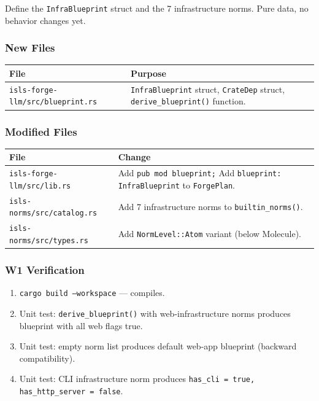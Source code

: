 \documentclass[11pt,a4paper]{article}
\begin{document}
Define the \texttt{InfraBlueprint} struct and the 7 infrastructure 
norms. Pure data, no behavior changes yet.

\subsubsection{New Files}

\begin{longtable}{lp{10cm}}
\toprule
\textbf{File} & \textbf{Purpose} \\
\midrule
\texttt{isls-forge-llm/src/blueprint.rs}
  & \texttt{InfraBlueprint} struct, \texttt{CrateDep} struct,
    \texttt{derive\_blueprint()} function. \\
\bottomrule
\end{longtable}

\subsubsection{Modified Files}

\begin{longtable}{lp{10cm}}
\toprule
\textbf{File} & \textbf{Change} \\
\midrule
\texttt{isls-forge-llm/src/lib.rs}
  & Add \texttt{pub mod blueprint;} Add \texttt{blueprint: InfraBlueprint}
    to \texttt{ForgePlan}. \\
\texttt{isls-norms/src/catalog.rs}
  & Add 7 infrastructure norms to \texttt{builtin\_norms()}. \\
\texttt{isls-norms/src/types.rs}
  & Add \texttt{NormLevel::Atom} variant (below Molecule). \\
\bottomrule
\end{longtable}

\subsubsection{W1 Verification}

\begin{enumerate}[nosep]
\item \texttt{cargo build --workspace} --- compiles.
\item Unit test: \texttt{derive\_blueprint()} with web-infrastructure 
      norms produces blueprint with all web flags true.
\item Unit test: empty norm list produces default web-app blueprint 
      (backward compatibility).
\item Unit test: CLI infrastructure norm produces 
      \texttt{has\_cli = true, has\_http\_server = false}.
\end{enumerate}
\end{document}
